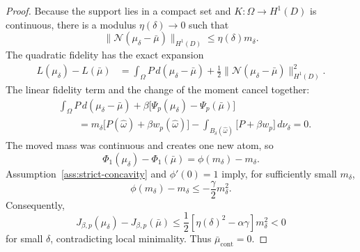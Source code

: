 \documentclass[11pt]{amsart}
\theoremstyle{definition}
\theoremstyle{remark}
\DeclareMathOperator{\cont}{cont}
\newcommand{\N}{\mathcal{N}}
\begin{document}
\begin{proof}
Because the support lies in a compact set and
$K:\Omega\to H^1(D)$ is continuous, there is a modulus
$\eta(\delta)\to0$ such that
\[
  \|\N(\mu_\delta-\bar\mu)\|_{H^1(D)}
  \leq
  \eta(\delta)m_\delta.
\]
The quadratic fidelity has the exact expansion
\begin{align*}
  L(\mu_\delta)-L(\bar\mu)
  &=
  \int_\Omega P\,d(\mu_\delta-\bar\mu)
  +
  \frac12
  \|\N(\mu_\delta-\bar\mu)\|_{H^1(D)}^2.
\end{align*}
The linear fidelity term and the change of the moment cancel together:
\begin{align*}
  &\int_\Omega P\,d(\mu_\delta-\bar\mu)
  +\beta\bigl[\Psi_p(\mu_\delta)-\Psi_p(\bar\mu)\bigr]\\
  &\qquad
  =
  m_\delta\bigl[P(\widehat\omega)+\beta w_p(\widehat\omega)\bigr]
  -
  \int_{B_\delta(\widehat\omega)}
  \bigl[P+\beta w_p\bigr]\,d\nu_\delta
  =0.
\end{align*}
The moved mass was continuous and creates one new atom, so
\[
  \Phi_1(\mu_\delta)-\Phi_1(\bar\mu)
  =
  \phi(m_\delta)-m_\delta.
\]
Assumption~\ref{ass:strict-concavity} and $\phi'(0)=1$ imply, for sufficiently
small $m_\delta$,
\[
  \phi(m_\delta)-m_\delta
  \leq
  -\frac{\gamma}{2}m_\delta^2.
\]
Consequently,
\[
  J_{\beta,p}(\mu_\delta)-J_{\beta,p}(\bar\mu)
  \leq
  \frac12\left[\eta(\delta)^2-\alpha\gamma\right]m_\delta^2<0
\]
for small $\delta$, contradicting local minimality.  Thus
$\bar\mu_{\cont}=0$.


\end{proof}
\end{document}
